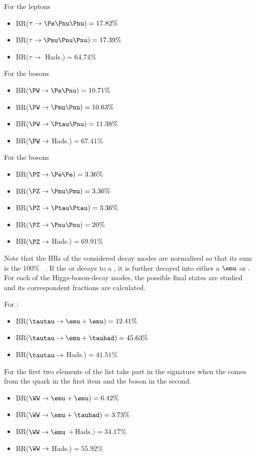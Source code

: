 \begin{multicols}{2}
For the \Ptau leptons 
\begin{itemize}
	\item  BR($\tau \rightarrow \Pe \Pnu \Pnu)= 17.82\%$
	\item  BR($\tau \rightarrow \Pmu \Pnu \Pnu)= 17.39\%$
	\item  BR($\tau \rightarrow$ Hads.)$= 64.74\%$
\end{itemize}
\columnbreak
For the \PW bosons
\begin{itemize}
	\item  BR($\PW \rightarrow \Pe \Pnu) = 10.71\%$
	\item  BR($\PW \rightarrow \Pmu \Pnu) = 10.63\%$
	\item  BR($\PW \rightarrow \Ptau \Pnu) =11.38\%$
	\item  BR($\PW \rightarrow$ Hads.)$= 67.41\%$
\end{itemize}
\end{multicols}
For the \PZ bosons
\begin{itemize}
	\item  BR($\PZ \rightarrow \Pe \Pe)= 3.36\%$
	\item  BR($\PZ \rightarrow \Pmu \Pmu)= 3.36\%$
	\item  BR($\PZ \rightarrow \Ptau \Ptau)= 3.36\%$
	\item  BR($\PZ \rightarrow \Pnu \Pnu)= 20\%$
	\item  BR($\PZ \rightarrow$ Hads.)$= 69.91\%$
\end{itemize}

Note that the BRs of the considered decay modes are normalised
so that its sum is the 100\% ~\cite{Workman:2022ynf}.
If the \PW or \PZ decays to a \Ptau, it is further decayed into either
a $\emu$ or \tauhad. 
For each of the Higgs-boson-decay modes, the possible final states are studied %
and its correspondent fractions are calculated. 

For \Htautau:
\begin{itemize}
	\item  BR($\tautau \rightarrow \emu + \emu)= 12.41\%$
	\item  BR($\tautau \rightarrow \emu + \tauhad)= 45.63\%$
	\item  BR($\tautau \rightarrow$ Hads.)$= 41.51\%$
\end{itemize}

For \HWW the first two elements of the list take part 
in the \dileptau signature when the \tauhad comes from 
the \Ptop quark in the first item and the \PHiggs boson
in the second. 
\begin{itemize}
	\item  BR($\WW \rightarrow \emu +\emu)= 6.42\%$ 
	\item  BR($\WW \rightarrow \emu +\tauhad)= 3.73\%$
	\item  BR($\WW \rightarrow \emu$ +$\,$Hads.$)= 34.17\%$
	\item  BR($\WW \rightarrow$ Hads.)$= 55.92\%$
\end{itemize}

